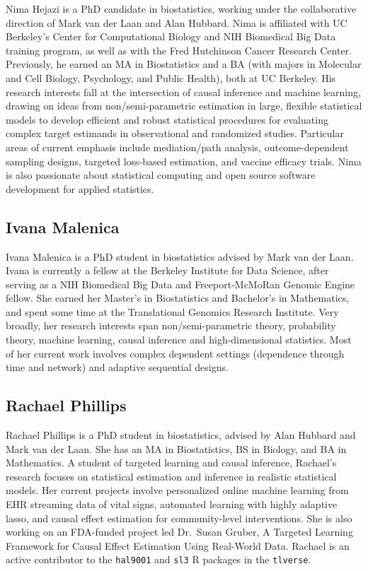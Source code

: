 \documentclass[
  12pt, krantz2,
]{krantz}
\newcommand{\passthrough}[1]{#1}
\theoremstyle{definition}
\theoremstyle{definition}
\theoremstyle{definition}
\newcommand{\1}{\mathbbm{1}}
\begin{document}
Nima Hejazi is a PhD candidate in biostatistics, working under the collaborative
direction of Mark van der Laan and Alan Hubbard. Nima is affiliated with UC
Berkeley's Center for Computational Biology and NIH Biomedical Big Data training
program, as well as with the Fred Hutchinson Cancer Research Center. Previously,
he earned an MA in Biostatistics and a BA (with majors in Molecular and Cell
Biology, Psychology, and Public Health), both at UC Berkeley. His research
interests fall at the intersection of causal inference and machine learning,
drawing on ideas from non/semi-parametric estimation in large, flexible
statistical models to develop efficient and robust statistical procedures for
evaluating complex target estimands in observational and randomized studies.
Particular areas of current emphasis include mediation/path analysis,
outcome-dependent sampling designs, targeted loss-based estimation, and vaccine
efficacy trials. Nima is also passionate about statistical computing and open
source software development for applied statistics.

\hypertarget{ivana-malenica}{%
\subsection*{Ivana Malenica}\label{ivana-malenica}}


Ivana Malenica is a PhD student in biostatistics advised by Mark van der Laan.
Ivana is currently a fellow at the Berkeley Institute for Data Science, after
serving as a NIH Biomedical Big Data and Freeport-McMoRan Genomic Engine fellow.
She earned her Master's in Biostatistics and Bachelor's in Mathematics, and
spent some time at the Translational Genomics Research Institute. Very broadly,
her research interests span non/semi-parametric theory, probability theory,
machine learning, causal inference and high-dimensional statistics. Most of her
current work involves complex dependent settings (dependence through time and
network) and adaptive sequential designs.

\hypertarget{rachael-phillips}{%
\subsection*{Rachael Phillips}\label{rachael-phillips}}


Rachael Phillips is a PhD student in biostatistics, advised by Alan Hubbard and
Mark van der Laan. She has an MA in Biostatistics, BS in Biology, and BA in
Mathematics. A student of targeted learning and causal inference, Rachael's
research focuses on statistical estimation and inference in realistic
statistical models. Her current projects involve personalized online machine
learning from EHR streaming data of vital signs, automated learning with
highly adaptive lasso, and causal effect estimation for community-level
interventions. She is also working on an FDA-funded project led Dr.~Susan
Gruber, A Targeted Learning Framework for Causal Effect Estimation Using
Real-World Data. Rachael is an active contributor to the \passthrough{\lstinline!hal9001!} and \passthrough{\lstinline!sl3!}
R packages in the \passthrough{\lstinline!tlverse!}.
\end{document}
